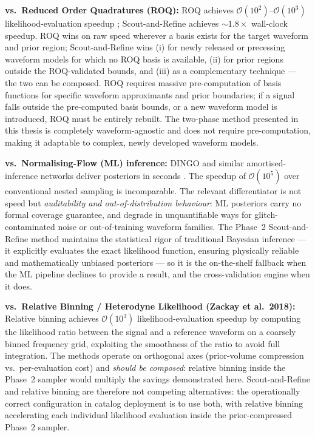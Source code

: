 \documentclass[12pt]{article}
\begin{document}
\textbf{vs.\ Reduced Order Quadratures (ROQ):} ROQ achieves $\mathcal{O}(10^{2})$--$\mathcal{O}(10^{3})$ likelihood-evaluation speedup \cite{Canizares2015,Smith2016}; Scout-and-Refine achieves $\sim 1.8\times$ wall-clock speedup. ROQ wins on raw speed wherever a basis exists for the target waveform and prior region; Scout-and-Refine wins (i) for newly released or precessing waveform models for which no ROQ basis is available, (ii) for prior regions outside the ROQ-validated bounds, and (iii) as a complementary technique --- the two can be composed. ROQ requires massive pre-computation of basis functions for specific waveform approximants and prior boundaries; if a signal falls outside the pre-computed basis bounds, or a new waveform model is introduced, ROQ must be entirely rebuilt. The two-phase method presented in this thesis is completely waveform-agnostic and does not require pre-computation, making it adaptable to complex, newly developed waveform models.

\textbf{vs.\ Normalising-Flow (ML) inference:} DINGO and similar amortised-inference networks deliver posteriors in seconds \cite{Dax2021}. The speedup of $\mathcal{O}(10^5)$ over conventional nested sampling is incomparable. The relevant differentiator is not speed but \emph{auditability and out-of-distribution behaviour}: ML posteriors carry no formal coverage guarantee, and degrade in unquantifiable ways for glitch-contaminated noise or out-of-training waveform families. The Phase~2 Scout-and-Refine method maintains the statistical rigor of traditional Bayesian inference --- it explicitly evaluates the exact likelihood function, ensuring physically reliable and mathematically unbiased posteriors --- so it is the on-the-shelf fallback when the ML pipeline declines to provide a result, and the cross-validation engine when it does.

\textbf{vs.\ Relative Binning / Heterodyne Likelihood (Zackay et al.\ 2018):} Relative binning \cite{Zackay2018} achieves $\mathcal{O}(10^{3})$ likelihood-evaluation speedup by computing the likelihood ratio between the signal and a reference waveform on a coarsely binned frequency grid, exploiting the smoothness of the ratio to avoid full integration. The methods operate on orthogonal axes (prior-volume compression vs.\ per-evaluation cost) and \emph{should be composed}: relative binning inside the Phase~2 sampler would multiply the savings demonstrated here. Scout-and-Refine and relative binning are therefore not competing alternatives: the operationally correct configuration in catalog deployment is to use both, with relative binning accelerating each individual likelihood evaluation inside the prior-compressed Phase~2 sampler.
\end{document}
